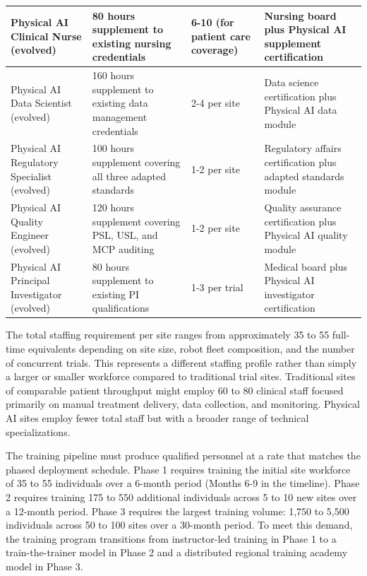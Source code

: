 \begin{longtable}{p{2.8cm} p{2.8cm} p{2.8cm} p{3.5cm}}
\midrule
Physical AI Clinical Nurse (evolved) & 80 hours supplement to existing nursing credentials & 6-10 (for patient care coverage) & Nursing board plus Physical AI supplement certification \\
\midrule
Physical AI Data Scientist (evolved) & 160 hours supplement to existing data management credentials & 2-4 per site & Data science certification plus Physical AI data module \\
\midrule
Physical AI Regulatory Specialist (evolved) & 100 hours supplement covering all three adapted standards & 1-2 per site & Regulatory affairs certification plus adapted standards module \\
\midrule
Physical AI Quality Engineer (evolved) & 120 hours supplement covering PSL, USL, and MCP auditing & 1-2 per site & Quality assurance certification plus Physical AI quality module \\
\midrule
Physical AI Principal Investigator (evolved) & 80 hours supplement to existing PI qualifications & 1-3 per trial & Medical board plus Physical AI investigator certification \\
\end{longtable}

The total staffing requirement per site ranges from approximately 35 to 55
full-time equivalents depending on site size, robot fleet composition, and
the number of concurrent trials. This represents a different staffing
profile rather than simply a larger or smaller workforce compared to
traditional trial sites. Traditional sites of comparable patient throughput
might employ 60 to 80 clinical staff focused primarily on manual treatment
delivery, data collection, and monitoring. Physical AI sites employ fewer
total staff but with a broader range of technical specializations.

The training pipeline must produce qualified personnel at a rate that matches
the phased deployment schedule. Phase 1 requires training the initial site
workforce of 35 to 55 individuals over a 6-month period (Months 6-9 in the
timeline). Phase 2 requires training 175 to 550 additional individuals across
5 to 10 new sites over a 12-month period. Phase 3 requires the largest
training volume: 1,750 to 5,500 individuals across 50 to 100 sites over a
30-month period. To meet this demand, the training program transitions from
instructor-led training in Phase 1 to a train-the-trainer model in Phase 2
and a distributed regional training academy model in Phase 3.

